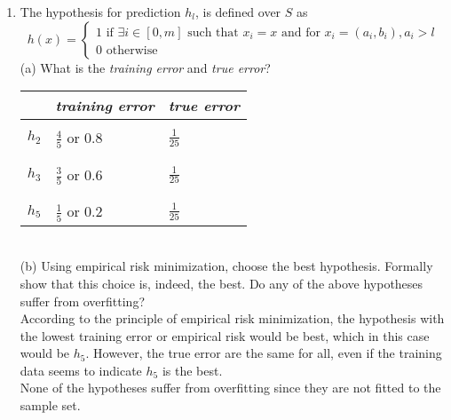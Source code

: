 \documentclass[12pt]{article}
\begin{document}
\begin{enumerate}
    \item The hypothesis for prediction $h_l$, is defined over $S$ as\\
    \[
    h(x)=\begin{cases}
    1 \text{ if $\exists i\in [0,m]$ such that $x_i=x$ and for $x_i=(a_i,b_i),a_i>l$}\\
    0 \text{ otherwise}
    \end{cases}
    \]
    (a) What is the \textit{training error} and \textit{true error}?\\
    \begin{tabular}{|l l l|}
    \hline
     & \textit{training error} & \textit{true error} \\
    \hline
    &&\\[-1em]
     $h_2$ & $\frac{4}{5}$ or $0.8$ & $\frac{1}{25}$ \\
    &&\\[-1em]
    \hline
    &&\\[-1em]
     $h_3$ & $\frac{3}{5}$ or $0.6$ & $\frac{1}{25}$ \\
    &&\\[-1em]
    \hline
    &&\\[-1em]
     $h_5$ & $\frac{1}{5}$ or $0.2$ & $\frac{1}{25}$ \\
    \hline
    \end{tabular}\\
    (b) Using empirical risk minimization, choose the best hypothesis. Formally show that this choice is, indeed, the best. Do any of the above hypotheses suffer from overfitting?\\
    According to the principle of empirical risk minimization, the hypothesis with the lowest training error or empirical risk would be best, which in this case would be $h_5$. However, the true error are the same for all, even if the training data seems to indicate $h_5$ is the best.\\
    None of the hypotheses suffer from overfitting since they are not fitted to the sample set.\\


\end{enumerate}
\end{document}
